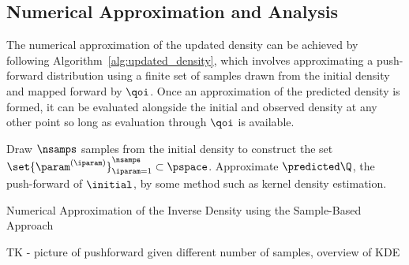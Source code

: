 \subsection{Numerical Approximation and Analysis}\label{sec:sample-algorithm}

The numerical approximation of the updated density can be achieved by following Algorithm~\ref{alg:updated_density}, which involves approximating a push-forward distribution using a finite set of samples drawn from the initial density and mapped forward by $\qoi$.
Once an approximation of the predicted density is formed, it can be evaluated alongside the initial and observed density at any other point so long as evaluation through $\qoi$ is available.



\begin{algorithm}[hbtp]
\DontPrintSemicolon
Draw $\nsamps$ samples from the initial density to construct the set $\set{\param^{(\iparam)}}_{\iparam=1}^{\nsamps} \subset \pspace$.
	Approximate $\predicted\Q$, the push-forward of $\initial$, by some method such as kernel density estimation.

 \caption{Numerical Approximation of the Inverse Density using the Sample-Based Approach}
 \label{alg:updated_density}
\end{algorithm}

TK -
picture of pushforward given different number of samples, overview of KDE
